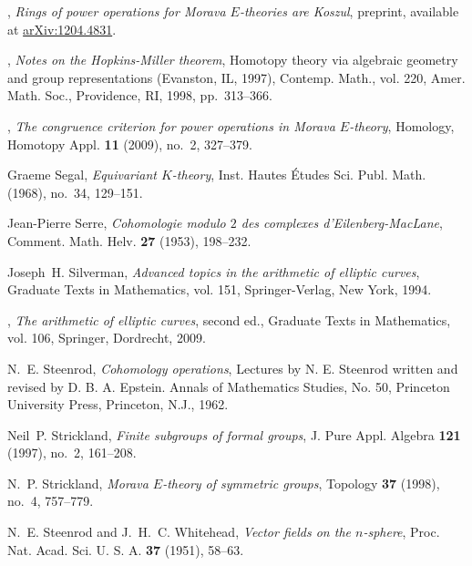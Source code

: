 \documentclass{gtpart}
\theoremstyle{definition}
\theoremstyle{remark}
\numberwithin{equation}{section}
\numberwithin{thm}{section}
\begin{document}
\begin{thebibliography}
\bysame, \emph{Rings of power operations for {M}orava ${E}$-theories are
  {K}oszul}, preprint, available at
  \href{http://arxiv.org/abs/1204.4831}{arXiv:1204.4831}.

\bysame, \emph{Notes on the {H}opkins-{M}iller theorem}, Homotopy theory via
  algebraic geometry and group representations ({E}vanston, {IL}, 1997),
  Contemp. Math., vol. 220, Amer. Math. Soc., Providence, RI, 1998,
  pp.~313--366. 

\bysame, \emph{The congruence criterion for power operations in {M}orava
  {$E$}-theory}, Homology, Homotopy Appl. \textbf{11} (2009), no.~2, 327--379.

Graeme Segal, \emph{Equivariant {$K$}-theory}, Inst. Hautes \'Etudes Sci. Publ.
  Math. (1968), no.~34, 129--151. 

Jean-Pierre Serre, \emph{Cohomologie modulo {$2$} des complexes
  d'{E}ilenberg-{M}ac{L}ane}, Comment. Math. Helv. \textbf{27} (1953),
  198--232. 

Joseph~H. Silverman, \emph{Advanced topics in the arithmetic of elliptic
  curves}, Graduate Texts in Mathematics, vol. 151, Springer-Verlag, New York,
  1994. 

\bysame, \emph{The arithmetic of elliptic curves}, second ed., Graduate Texts
  in Mathematics, vol. 106, Springer, Dordrecht, 2009. 

N.~E. Steenrod, \emph{Cohomology operations}, Lectures by N. E. Steenrod
  written and revised by D. B. A. Epstein. Annals of Mathematics Studies, No.
  50, Princeton University Press, Princeton, N.J., 1962. 

Neil~P. Strickland, \emph{Finite subgroups of formal groups}, J. Pure Appl.
  Algebra \textbf{121} (1997), no.~2, 161--208. 

N.~P. Strickland, \emph{Morava {$E$}-theory of symmetric groups}, Topology
  \textbf{37} (1998), no.~4, 757--779. 

N.~E. Steenrod and J.~H.~C. Whitehead, \emph{Vector fields on the
  {$n$}-sphere}, Proc. Nat. Acad. Sci. U. S. A. \textbf{37} (1951), 58--63.


\end{thebibliography}
\end{document}
